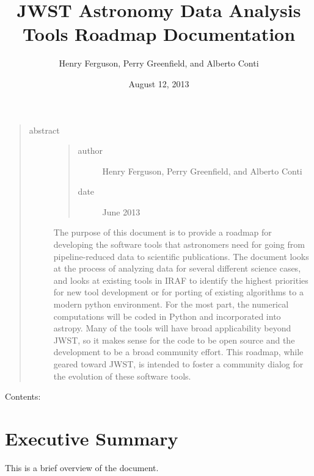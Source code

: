 \documentclass[letterpaper,10pt,english]{sphinxmanual}
\title{JWST Astronomy Data Analysis Tools Roadmap Documentation}
\date{August 12, 2013}
\author{Henry Ferguson, Perry Greenfield, and Alberto Conti}
\begin{document}
\maketitle
\tableofcontents
{}\label{index::doc}

\begin{quote}\begin{description}
\item[{abstract}] \leavevmode\begin{quote}\begin{description}
\item[{author}] \leavevmode
Henry Ferguson, Perry Greenfield, and Alberto Conti

\item[{date}]  June 2013

\end{description}\end{quote}

The purpose of this document is to provide a roadmap for developing
the software tools that astronomers need for going from pipeline-reduced
data to scientific publications. The document looks at the process of
analyzing data for several different science cases, and looks at existing
tools in IRAF to identify the highest priorities for new tool development
or for porting of existing algorithms to a modern python environment.
For the most part, the numerical computations will be coded in Python and
incorporated into astropy. Many of the tools will have broad applicability
beyond JWST, so it makes sense for the code to be open source and the
development to be a broad community effort. This roadmap, while geared toward
JWST, is intended to foster a community dialog for the evolution of
these software tools.

\end{description}\end{quote}

Contents:


\chapter{Executive Summary}
\label{exec_summary:executive-summary}\label{exec_summary::doc}\label{exec_summary:jwst-astronomy-data-analysis-tools-roadmap}
This is a brief overview of the document.
\end{document}
